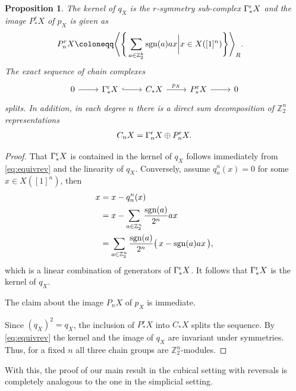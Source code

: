 \documentclass[12pt]{amsart}
\theoremstyle{plain}
\numberwithin{lemma}{\DefaultNumberTheoremWithin}
\numberwithin{claim}{\DefaultNumberTheoremWithin}
\numberwithin{theorem}{\DefaultNumberTheoremWithin}
\numberwithin{corollary}{\DefaultNumberTheoremWithin}
\newtheorem{proposition}{Proposition}
\numberwithin{proposition}{\DefaultNumberTheoremWithin}
\numberwithin{conjecture}{\DefaultNumberTheoremWithin}
\theoremstyle{definition}
\theoremstyle{definition}
\numberwithin{question}{\DefaultNumberTheoremWithin}
\theoremstyle{definition}
\numberwithin{problem}{\DefaultNumberTheoremWithin}
\theoremstyle{remark}
\numberwithin{remark}{\DefaultNumberTheoremWithin}
\theoremstyle{remark}
\numberwithin{example}{\DefaultNumberTheoremWithin}
\def\blt{*}
\def\one{[1]}
\def\kk{{R}}
\def\letbe{\coloneqq}
\def\sgn{\textnormal{sgn}}
\def\ZZ{\mathbb Z}
\def\rev{\textnormal{r}}
\def\pirev{q}
\def\Con{\mathrm{\Gamma}}  %
\def\rCon{\Con^{\rev}}   %
\newcommand{\prev}[2]{q_{#2}^{#1}}
\begin{document}
\begin{proposition}\label{RevSplit}
The kernel of $\pirev_X$ is the $r$-symmetry sub-complex $\rCon_\blt X$ and the image $P^r_\blt X$ of $p_X$ is given as 
\begin{align*}
      P_n^{r} X\letbe&\Bigg\langle \Bigg\{ \sum_{a\in \ZZ_2^k} \sgn(a)a x \bigg\vert x\in X([1]^n)\Bigg \} \Bigg\rangle_{\kk}.
\end{align*}
The exact sequence of chain complexes
  \[
   \begin{tikzcd}
    0\arrow{r}{}&\rCon_\blt X\arrow[hook]{r}{} &C_\blt X\arrow{r}{p_X}&P^{\rev}_\blt X \arrow{r}&0
    \end{tikzcd}
\]
splits. In addition, in each degree $n$ there is a direct sum decomposition of $\mathbb{Z}_2^{n}$ representations
\begin{align*}
C_n X=\rCon_n X\oplus P^{\rev}_n X.
\end{align*}
\end{proposition}
\begin{proof}
That $\rCon_\blt X$ is contained in the
kernel of $\pirev_X$ follows immediately from \eqref{eq:equivrev} and the linearity of $\pirev_X$.
Conversely, assume $\prev{n}{n}(x)=0$
for some $x \in X(\one^n)$, then 
\begin{align*}
    x&=x-\prev{n}{n}(x)\\
    &=x-\sum_{a\in \ZZ_2^n} \frac{\sgn(a)}{2^n}ax\\
    &=\sum_{a\in \ZZ_2^n} \frac{\sgn(a)}{2^n}\big(\,x- \sgn(a)a x\,\big),
\end{align*}
which is a linear combination of generators of 
$\rCon_\blt X$.
It follows that $\rCon_\blt X$ is the kernel of $\pirev_X$.

The claim about the image $P_nX$ of $p_X$ is immediate.

Since $(\pirev_X)^2=\pirev_X$, the inclusion of $P^r_\blt X$ into $C_\blt X$ splits the sequence.
 By \eqref{eq:equivrev} the kernel and the image of $\pirev_X$ 
    are invariant under symmetries.
    Thus, for a fixed $n$ all three chain groups are $\mathbb{Z}_2^n$-modules.
\end{proof}

With this, the proof of our main result in the cubical setting with reversals is completely analogous to the one in the simplicial setting.  
\end{document}
